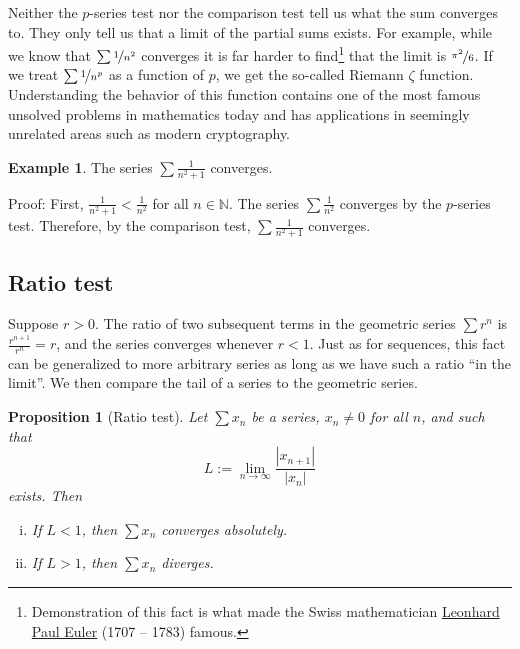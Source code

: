 \documentclass[12pt]{book}
\newcommand{\abs}[1]{\left\lvert {#1} \right\rvert}
\newcommand{\N}{{\mathbb{N}}}
\theoremstyle{plain}
\newtheorem{prop}[thm]{Proposition}
\theoremstyle{remark}
\theoremstyle{definition}
\theoremstyle{exercise}
\theoremstyle{example}
\newtheorem{example}[thm]{Example}
\begin{document}
Neither the $p$-series test nor the comparison test 
tell us what the sum converges to.  They only tell us that a limit
of the partial sums exists.  For example, while we know that
$\sum \nicefrac{1}{n^2}$ converges it is far harder to
find\footnote{Demonstration of this fact is
what made the Swiss mathematician
\href{http://en.wikipedia.org/wiki/Leonhard_Euler}{Leonhard Paul Euler} (1707 -- 1783)
famous.}
that the limit is $\nicefrac{\pi^2}{6}$.
If we treat $\sum \nicefrac{1}{n^p}$ as a function of $p$,
we get the so-called Riemann $\zeta$ function.  Understanding the
behavior of this function contains
one of the most famous unsolved problems in mathematics today and has applications
in seemingly unrelated areas such as modern cryptography.

\begin{example}
The series $\sum \frac{1}{n^2+1}$ converges.

Proof:  First, $\frac{1}{n^2+1} < \frac{1}{n^2}$ for all $n \in \N$.
The series $\sum \frac{1}{n^2}$ converges by the $p$-series test.
Therefore, by the comparison test, $\sum \frac{1}{n^2+1}$ converges.
\end{example}

\subsection{Ratio test}

Suppose $r > 0$.  The ratio of two subsequent terms in the geometric series $\sum
r^n$ is $\frac{r^{n+1}}{r^n} = r$, and the series converges
whenever $r < 1$.  Just as for sequences, this fact
can be generalized to more arbitrary series
as long as we have such a ratio ``in the limit''.  We then compare
the tail of a series to the geometric series.


\begin{prop}[Ratio test]
Let $\sum x_n$ be a series, $x_n \not= 0$ for all $n$, and such that
\begin{equation*}
L := \lim_{n\to\infty} \frac{\abs{x_{n+1}}}{\abs{x_n}}
\end{equation*}
exists.  Then
\begin{enumerate}[(i)]
\item
If $L < 1$, then $\sum x_n$ converges absolutely.
\item
If $L > 1$, then $\sum x_n$ diverges.
\end{enumerate}
\end{prop}
\end{document}

